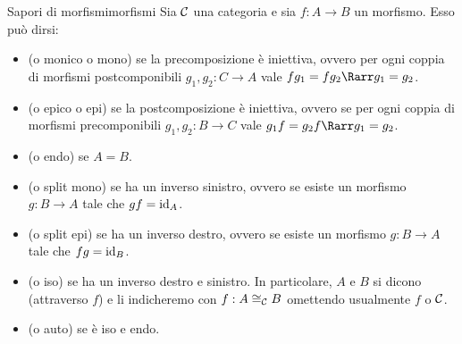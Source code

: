 \documentclass{article}
\renewcommand\C{\mc{C}}
\begin{document}
\begin{definition}{Sapori di morfismi}{morfismi}
    Sia $\C$ una categoria e sia $f: A\to B$ un morfismo. Esso può dirsi:\begin{itemize}
        \item {} (o monico o mono) se la precomposizione è iniettiva, ovvero per ogni coppia di morfismi postcomponibili $g_1, g_2 : C\to A$ vale $fg_1 = fg_2 \Rarr g_1=g_2$.
        \item {} (o epico o epi) se la postcomposizione è iniettiva, ovvero se per ogni coppia di morfismi precomponibili $g_1, g_2 : B\to C$ vale $g_1f = g_2f \Rarr g_1=g_2$.
        \item {} (o endo) se $A=B$.
        \item {} (o split mono) se ha un inverso sinistro, ovvero se esiste un morfismo $g:B\to A$ tale che $gf = \operatorname{id}_A$.
        \item {} (o split epi) se ha un inverso destro, ovvero se esiste un morfismo $g:B\to A$ tale che $fg = \operatorname{id}_B$.
        \item {} (o iso) se ha un inverso destro e sinistro. In particolare, $A$ e $B$ si dicono  (attraverso $f$) e li indicheremo con $f:A\cong_\C B$ omettendo usualmente $f$ o $\C$.
        \item {} (o auto) se è iso e endo.
    \end{itemize}    
\end{definition}
\end{document}
